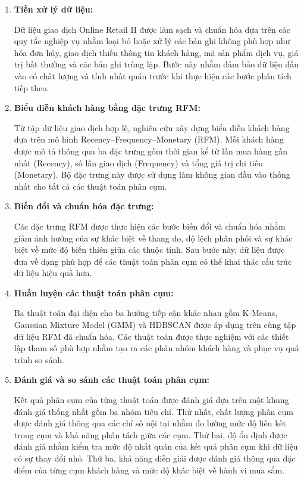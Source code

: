 \documentclass[12pt]{ai_conquer2026}
\begin{document}
\begin{enumerate}

\item \textbf{Tiền xử lý dữ liệu:}

Dữ liệu giao dịch Online Retail II được làm sạch và chuẩn hóa dựa trên các quy tắc nghiệp vụ nhằm loại bỏ hoặc xử lý các bản ghi không phù hợp như hóa đơn hủy, giao dịch thiếu thông tin khách hàng, mã sản phẩm dịch vụ, giá trị bất thường và các bản ghi trùng lặp. Bước này nhằm đảm bảo dữ liệu đầu vào có chất lượng và tính nhất quán trước khi thực hiện các bước phân tích tiếp theo.

\item \textbf{Biểu diễn khách hàng bằng đặc trưng RFM:}

Từ tập dữ liệu giao dịch hợp lệ, nghiên cứu xây dựng biểu diễn khách hàng dựa trên mô hình Recency--Frequency--Monetary (RFM). Mỗi khách hàng được mô tả thông qua ba đặc trưng gồm thời gian kể từ lần mua hàng gần nhất (Recency), số lần giao dịch (Frequency) và tổng giá trị chi tiêu (Monetary). Bộ đặc trưng này được sử dụng làm không gian đầu vào thống nhất cho tất cả các thuật toán phân cụm.

\item \textbf{Biến đổi và chuẩn hóa đặc trưng:}

Các đặc trưng RFM được thực hiện các bước biến đổi và chuẩn hóa nhằm giảm ảnh hưởng của sự khác biệt về thang đo, độ lệch phân phối và sự khác biệt về mức độ biến thiên giữa các thuộc tính. Sau bước này, dữ liệu được đưa về dạng phù hợp để các thuật toán phân cụm có thể khai thác cấu trúc dữ liệu hiệu quả hơn.

\item \textbf{Huấn luyện các thuật toán phân cụm:}

Ba thuật toán đại diện cho ba hướng tiếp cận khác nhau gồm K-Means, Gaussian Mixture Model (GMM) và HDBSCAN được áp dụng trên cùng tập dữ liệu RFM đã chuẩn hóa. Các thuật toán được thực nghiệm với các thiết lập tham số phù hợp nhằm tạo ra các phân nhóm khách hàng và phục vụ quá trình so sánh.

\item \textbf{Đánh giá và so sánh các thuật toán phân cụm:}

Kết quả phân cụm của từng thuật toán được đánh giá dựa trên một khung đánh giá thống nhất gồm ba nhóm tiêu chí. Thứ nhất, chất lượng phân cụm được đánh giá thông qua các chỉ số nội tại nhằm đo lường mức độ liên kết trong cụm và khả năng phân tách giữa các cụm. Thứ hai, độ ổn định được đánh giá nhằm kiểm tra mức độ nhất quán của kết quả phân cụm khi dữ liệu có sự thay đổi nhỏ. Thứ ba, khả năng diễn giải được đánh giá thông qua đặc điểm của từng cụm khách hàng và mức độ khác biệt về hành vi mua sắm.


\end{enumerate}
\end{document}
